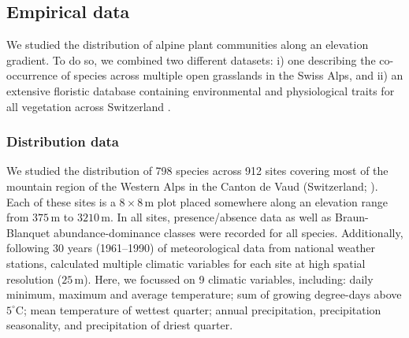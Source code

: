 \documentclass[11pt, a4paper]{article}
\begin{document}
\subsection*{Empirical data}
We studied the distribution of alpine plant communities along an elevation gradient. To do so, we combined two different datasets: i) one describing the co-occurrence of species across multiple open grasslands in the Swiss Alps, and ii) an extensive floristic database containing environmental and physiological traits for all vegetation across Switzerland \citep{landoltFloraIndicativaOkologische2010}. 

\subsubsection*{Distribution data}
We studied the distribution of 798 species across 912 sites covering most of the mountain region of the Western Alps in the Canton de Vaud (Switzerland; \citealt{scherrerEcologicalIndicatorValues2019}). Each of these sites is a $8\times 8\,\text{m}$ plot placed somewhere along an elevation range from $375\,\text{m}$ to $3210\,\text{m}$. In all sites, presence/absence data as well as Braun-Blanquet abundance-dominance classes were recorded for all species. Additionally, following 30 years (1961–1990) of meteorological data from national weather stations, \citet{scherrerEcologicalIndicatorValues2019} calculated multiple climatic variables for each site at high spatial resolution ($25\,\text{m}$). Here, we focussed on 9 climatic variables, including: daily minimum, maximum and average temperature; sum of growing degree-days above $5^{\circ}\text{C}$; mean temperature of wettest quarter; annual precipitation, precipitation seasonality, and precipitation of driest quarter. %
\end{document}
